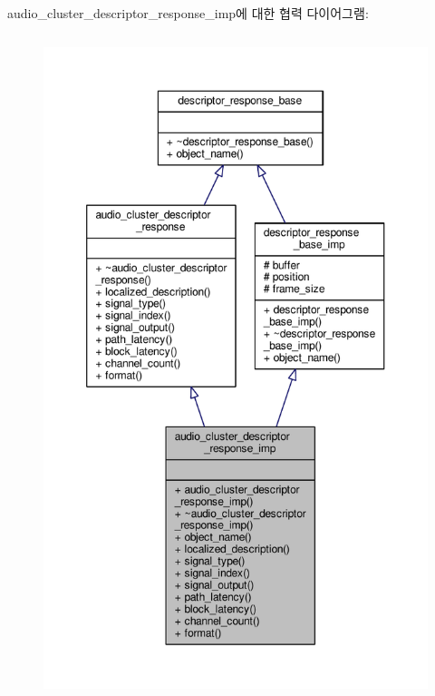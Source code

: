 audio\+\_\+cluster\+\_\+descriptor\+\_\+response\+\_\+imp에 대한 협력 다이어그램\+:
\nopagebreak
\begin{figure}[H]
\begin{center}
\leavevmode
\includegraphics[height=550pt]{classavdecc__lib_1_1audio__cluster__descriptor__response__imp__coll__graph}
\end{center}
\end{figure}
